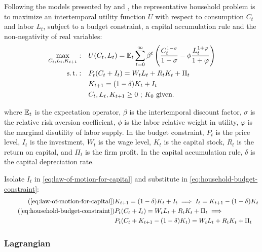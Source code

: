 \documentclass[
thesis.tex
]{subfiles}
\begin{document}
	
	Following the models presented by \textcite{costa_junior_understanding_2016} and \textcite{solis-garcia_ucb_2022}, the representative household problem is to maximize an intertemporal utility function $U$ with respect to consumption $C_t$ and labor $L_t$, subject to a budget constraint, a capital accumulation rule and the non-negativity of real variables:
	\begin{align}
		\label{eq:household-utility-function}
		\max_{C_t,L_t,K_{t+1}}: \quad & U(C_t,L_t) = {\mathbb{E}_{t}} \sum_{t=0}^{\infty} \beta^t \left(\frac{C_t^{1-\sigma}}{1-\sigma} - \phi \frac{L_t^{1+\varphi}}{1+\varphi} \right) \\
		\label{eq:household-budget-constraint}
		\operatorname{s.t.}: \quad & P_t (C_t + I_t) = W_t L_t + R_t K_t + \Pi_t \\
		\label{eq:law-of-motion-for-capital}
		\quad & K_{t+1} = (1-\delta)K_t + I_t \\
		\quad & C_t,L_t,K_{t+1} \geq 0 \text{ ; $K_0$ given.} \nonumber
	\end{align}
	
	where ${\mathbb{E}_{t}}$ is the expectation operator, $\beta$ is the intertemporal discount factor, $\sigma$ is the relative risk aversion coefficient, $\phi$ is the labor relative weight in utility, $\varphi$ is the marginal disutility of labor supply. In the budget constraint, $P_t$ is the price level, $I_t$ is the investment, $W_t$ is the wage level, $K_t$ is the capital stock, $R_t$ is the return on capital, and $\Pi_t$ is the firm profit. In the capital accumulation rule, $\delta$ is the capital depreciation rate.
	
	Isolate $I_t$ in \ref{eq:law-of-motion-for-capital} and substitute in \ref{eq:household-budget-constraint}:
	\begin{align}
		\tag{\ref{eq:law-of-motion-for-capital}}
		& K_{t+1} = (1-\delta)K_t + I_t \implies I_t = K_{t+1} - (1-\delta)K_t \\
		\tag{\ref{eq:household-budget-constraint}}
		& P_t (C_t + I_t) = W_t L_t + R_t K_t + \Pi_t \implies \\
		\label{eq:household-budget-constraint-2}
		& P_t (C_t + K_{t+1} - (1-\delta)K_t) = W_t L_t + R_t K_t + \Pi_t
	\end{align}
	
	\subsubsection*{Lagrangian}
	
\end{document}
